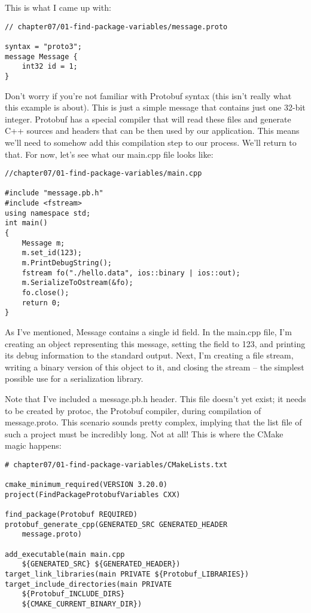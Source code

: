 This is what I came up with:

\begin{lstlisting}[style=styleCXX]
// chapter07/01-find-package-variables/message.proto

syntax = "proto3";
message Message {
	int32 id = 1;
}
\end{lstlisting}

Don't worry if you're not familiar with Protobuf syntax (this isn't really what this example is about). This is just a simple message that contains just one 32-bit integer. Protobuf has a special compiler that will read these files and generate C++ sources and headers that can be then used by our application. This means we'll need to somehow add this compilation step to our process. We'll return to that. For now, let's see what our main.cpp file looks like:

\begin{lstlisting}[style=styleCXX]
//chapter07/01-find-package-variables/main.cpp

#include "message.pb.h"
#include <fstream>
using namespace std;
int main()
{
	Message m;
	m.set_id(123);
	m.PrintDebugString();
	fstream fo("./hello.data", ios::binary | ios::out);
	m.SerializeToOstream(&fo);
	fo.close();
	return 0;
}
\end{lstlisting}

As I've mentioned, Message contains a single id field. In the main.cpp file, I'm creating an object representing this message, setting the field to 123, and printing its debug information to the standard output. Next, I'm creating a file stream, writing a binary version of this object to it, and closing the stream – the simplest possible use for a serialization library.

Note that I've included a message.pb.h header. This file doesn't yet exist; it needs to be created by protoc, the Protobuf compiler, during compilation of message.proto. This scenario sounds pretty complex, implying that the list file of such a project must be incredibly long. Not at all! This is where the CMake magic happens:

\begin{lstlisting}[style=styleCMake]
# chapter07/01-find-package-variables/CMakeLists.txt

cmake_minimum_required(VERSION 3.20.0)
project(FindPackageProtobufVariables CXX)

find_package(Protobuf REQUIRED)
protobuf_generate_cpp(GENERATED_SRC GENERATED_HEADER
	message.proto)

add_executable(main main.cpp
	${GENERATED_SRC} ${GENERATED_HEADER})
target_link_libraries(main PRIVATE ${Protobuf_LIBRARIES})
target_include_directories(main PRIVATE
	${Protobuf_INCLUDE_DIRS}
	${CMAKE_CURRENT_BINARY_DIR})
\end{lstlisting}

